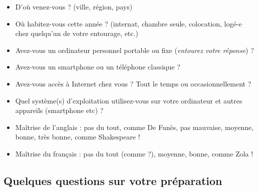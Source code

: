 \begin{itemize}
    \item D'où venez-vous ? (ville, région, pays)
    \item Où habitez-vous cette année ? (internat, chambre seule, colocation, logé-e chez quelqu'un de votre entourage, etc.)
    \item Avez-vous un ordinateur personnel portable ou fixe (\emph{entourez votre réponse}) ?
    \item Avez-vous un smartphone ou un téléphone classique ?
    \item Avez-vous accès à Internet chez vous ? Tout le temps ou occasionnellement ?
    \item Quel système(s) d'exploitation utilisez-vous sur votre ordinateur et autres appareils (smartphone etc) ?
    \item Maîtrise de l'anglais : pas du tout, comme De Funès, pas mauvaise, moyenne, bonne, très bonne, comme Shakespeare !
    \item Maîtrise du français : pas du tout (comme ?), moyenne, bonne, comme Zola !
\end{itemize}


\subsection*{Quelques questions sur votre préparation}

